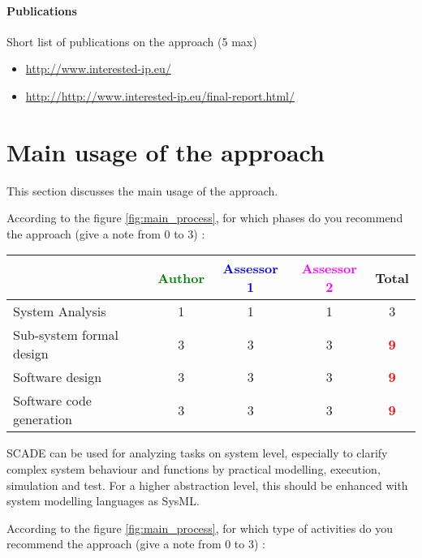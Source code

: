 \paragraph{Publications} Short list of publications on the approach (5 max)

\begin{itemize}
	\item \url{http://www.interested-ip.eu/}
  \item \url{http://http://www.interested-ip.eu/final-report.html/}

\end{itemize}

\section{Main usage of the approach}
\label{main_usage}
This section discusses the main usage of the approach.

According to the figure \ref{fig:main_process}, for which phases do you recommend the approach (give a note from 0 to  3) :

\begin{tabular}{|l | c | c | c | c|}
\hline
& \textcolor{green}{Author} & \textcolor{blue}{Assessor 1} & \textcolor{magenta}{Assessor 2} & Total \\
\hline 
System Analysis & 1     & 1    &1 & 3    \\
\hline
Sub-system  formal  design &  3 & 3    &3 & \textcolor{red}{\textbf{9}} \\
\hline
Software design & 3     & 3    & 3    & \textcolor{red}{\textbf{9}} \\
\hline
Software code generation & 3    & 3    &3 & \textcolor{red}{\textbf{9}} \\
\hline
\end{tabular}

\begin{author_comment}
SCADE can be used for analyzing tasks on system level, especially to clarify complex system behaviour and functions by practical modelling, execution, simulation and test. For a higher abstraction level, this should be enhanced with system modelling languages as SysML.
\end{author_comment}
According to the figure \ref{fig:main_process}, for which type of activities do you recommend the approach (give a note from 0 to  3) :

